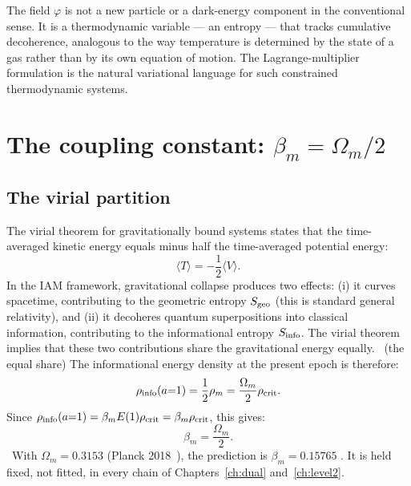 The field $\varphi$ is not a new particle or a dark-energy component in the conventional sense. It is a thermodynamic variable --- an entropy --- that
tracks cumulative decoherence, analogous to the way temperature is determined by the state of a gas rather than by its own equation of motion. The
Lagrange-multiplier formulation is the natural variational language for such constrained thermodynamic systems. \interp

\section{The coupling constant: $\beta_m=\Omega_m/2$}\label{sec:th:coupling}
\subsection{The virial partition}
The virial theorem for gravitationally bound systems states that the time-averaged kinetic energy equals minus half the time-averaged potential
energy:
\begin{equation}\langle T\rangle=-\frac12\langle V\rangle .\label{eq:th:virialavg}\end{equation}
In the IAM framework, gravitational collapse produces two effects: (i) it curves spacetime, contributing to the geometric entropy $S_{\rm geo}$ (this is
standard general relativity), and (ii) it decoheres quantum superpositions into classical information, contributing to the informational entropy
$S_{\rm info}$. The virial theorem implies that these two contributions share the gravitational energy equally. \conjecture\ (the equal share) The
informational energy density at the present epoch is therefore:
\begin{equation}\rho_{\rm info}(a{=}1)=\frac12\rho_m=\frac{\Omega_m}{2}\rho_{\rm crit}.\label{eq:th:rhoinfo1}\end{equation}
Since $\rho_{\rm info}(a{=}1)=\beta_mE(1)\rho_{\rm crit}=\beta_m\rho_{\rm crit}$, this gives:
\begin{equation}\beta_m=\frac{\Omega_m}{2}.\label{eq:th:betam}\end{equation}
\derived\ With $\Omega_m=0.3153$ (Planck 2018~\cite{Planck2018VI}), the prediction is $\beta_m=0.15765$ \calc. It is held fixed, not fitted, in every chain of
Chapters~\ref{ch:dual} and~\ref{ch:level2}.

